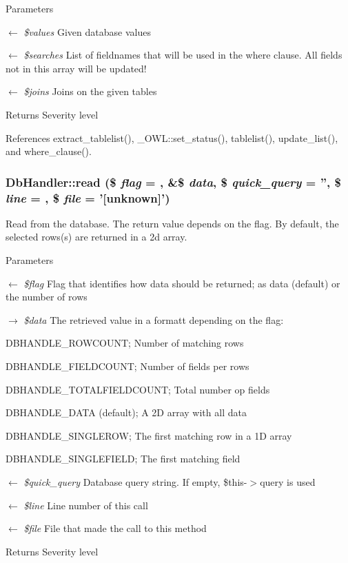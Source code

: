 \begin{DoxyParams}{Parameters}
\item[\mbox{$\leftarrow$} {\em \$values}]Given database values \item[\mbox{$\leftarrow$} {\em \$searches}]List of fieldnames that will be used in the where clause. All fields not in this array will be updated! \item[\mbox{$\leftarrow$} {\em \$joins}]Joins on the given tables \end{DoxyParams}
\begin{DoxyReturn}{Returns}
Severity level 
\end{DoxyReturn}


References extract\_\-tablelist(), \_\-OWL::set\_\-status(), tablelist(), update\_\-list(), and where\_\-clause().

\subsubsection[{read}]{\setlength{\rightskip}{0pt plus 5cm}DbHandler::read (\$ {\em flag} = {}, \/  \&\$ {\em data}, \/  \$ {\em quick\_\-query} = {\ttfamily ''}, \/  \$ {\em line} = {}, \/  \$ {\em file} = {\ttfamily '\mbox{[}unknown\mbox{]}'})}\label{classDbHandler_a5ebfdc2acfcb0e9cbc2861fc55c7127c}
Read from the database. The return value depends on the flag. By default, the selected rows(s) are returned in a 2d array.


\begin{DoxyParams}{Parameters}
\item[\mbox{$\leftarrow$} {\em \$flag}]Flag that identifies how data should be returned; as data (default) or the number of rows \item[\mbox{$\rightarrow$} {\em \$data}]The retrieved value in a formatt depending on the flag:
\begin{DoxyItemize}
\item DBHANDLE\_\-ROWCOUNT; Number of matching rows
\item DBHANDLE\_\-FIELDCOUNT; Number of fields per rows
\item DBHANDLE\_\-TOTALFIELDCOUNT; Total number op fields
\item DBHANDLE\_\-DATA (default); A 2D array with all data
\item DBHANDLE\_\-SINGLEROW; The first matching row in a 1D array
\item DBHANDLE\_\-SINGLEFIELD; The first matching field 
\end{DoxyItemize}\item[\mbox{$\leftarrow$} {\em \$quick\_\-query}]Database query string. If empty, \$this-\/$>$query is used \item[\mbox{$\leftarrow$} {\em \$line}]Line number of this call \item[\mbox{$\leftarrow$} {\em \$file}]File that made the call to this method \end{DoxyParams}
\begin{DoxyReturn}{Returns}
Severity level 
\end{DoxyReturn}


